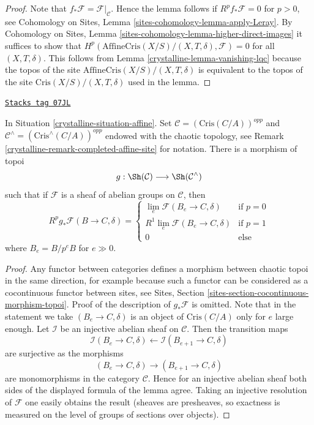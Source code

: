 \begin{proof}
\medskip\noindent
Note that $f_*\mathcal{F} = \mathcal{F}|_\mathcal{C}$. Hence the lemma
follows if $R^pf_*\mathcal{F} = 0$ for $p > 0$, see
Cohomology on Sites, Lemma \ref{sites-cohomology-lemma-apply-Leray}. By
Cohomology on Sites, Lemma \ref{sites-cohomology-lemma-higher-direct-images}
it suffices to show that
$H^p(\text{AffineCris}(X/S)/(X, T, \delta), \mathcal{F}) = 0$
for all $(X, T, \delta)$.
This follows from Lemma \ref{crystalline-lemma-vanishing-lqc} because the
topos of the site $\text{AffineCris}(X/S)/(X, T, \delta)$
is equivalent to the topos of the site
$\text{Cris}(X/S)/(X, T, \delta)$ used in the lemma.
\end{proof}

\begin{lemma}[Complete]
\label{crystalline-lemma-complete}
\href{https://stacks.math.columbia.edu/tag/07JL}{\texttt{Stacks tag 07JL}}

In Situation \ref{crystalline-situation-affine}.
Set $\mathcal{C} = (\text{Cris}(C/A))^{opp}$ and
$\mathcal{C}^\wedge = (\text{Cris}^\wedge(C/A))^{opp}$
endowed with the chaotic topology, see
Remark \ref{crystalline-remark-completed-affine-site} for notation.
There is a morphism of topoi
$$
g : \Sh(\mathcal{C}) \longrightarrow \Sh(\mathcal{C}^\wedge)
$$
such that if $\mathcal{F}$ is a sheaf of abelian groups on
$\mathcal{C}$, then
$$
R^pg_*\mathcal{F}(B \to C, \delta) =
\left\{
\begin{matrix}
\lim_e \mathcal{F}(B_e \to C, \delta) & \text{if }p = 0 \\
R^1\lim_e \mathcal{F}(B_e \to C, \delta) & \text{if }p = 1 \\
0 & \text{else}
\end{matrix}
\right.
$$
where $B_e = B/p^eB$ for $e \gg 0$.
\end{lemma}

\begin{proof}
Any functor between categories defines a morphism between chaotic
topoi in the same direction, for example because such a functor
can be considered as a cocontinuous functor between sites, see
Sites, Section \ref{sites-section-cocontinuous-morphism-topoi}.
Proof of the description of $g_*\mathcal{F}$ is omitted.
Note that in the statement we take $(B_e \to C, \delta)$
is an object of $\text{Cris}(C/A)$  only for $e$ large enough.
Let $\mathcal{I}$ be an injective abelian sheaf on $\mathcal{C}$.
Then the transition maps
$$
\mathcal{I}(B_e \to C, \delta) \leftarrow
\mathcal{I}(B_{e + 1} \to C, \delta)
$$
are surjective as the morphisms
$$
(B_e \to C, \delta)
\longrightarrow
(B_{e + 1} \to C, \delta)
$$
are monomorphisms in the category $\mathcal{C}$. Hence for an injective
abelian sheaf both sides of the displayed formula of the lemma agree.
Taking an injective resolution of $\mathcal{F}$ one easily obtains
the result (sheaves are presheaves, so exactness is measured on the
level of groups of sections over objects).
\end{proof}

